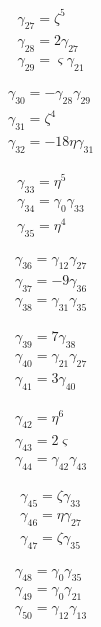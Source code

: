 \[\begin{aligned}\gamma_{27}=\zeta ^{5}\\ \gamma_{28}=2 \gamma_{27}\\ \gamma_{29}=\varsigma  \gamma_{21}\end{aligned}\]

\[\begin{aligned}\gamma_{30}=- \gamma_{28} \gamma_{29}\\ \gamma_{31}=\zeta ^{4}\\ \gamma_{32}=- 18 \eta  \gamma_{31}\end{aligned}\]

\[\begin{aligned}\gamma_{33}=\eta ^{5}\\ \gamma_{34}=\gamma_{0} \gamma_{33}\\ \gamma_{35}=\eta ^{4}\end{aligned}\]

\[\begin{aligned}\gamma_{36}=\gamma_{12} \gamma_{27}\\ \gamma_{37}=- 9 \gamma_{36}\\ \gamma_{38}=\gamma_{31} \gamma_{35}\end{aligned}\]

\[\begin{aligned}\gamma_{39}=7 \gamma_{38}\\ \gamma_{40}=\gamma_{21} \gamma_{27}\\ \gamma_{41}=3 \gamma_{40}\end{aligned}\]

\[\begin{aligned}\gamma_{42}=\eta ^{6}\\ \gamma_{43}=2 \varsigma \\ \gamma_{44}=\gamma_{42} \gamma_{43}\end{aligned}\]

\[\begin{aligned}\gamma_{45}=\zeta  \gamma_{33}\\ \gamma_{46}=\eta  \gamma_{27}\\ \gamma_{47}=\zeta  \gamma_{35}\end{aligned}\]

\[\begin{aligned}\gamma_{48}=\gamma_{0} \gamma_{35}\\ \gamma_{49}=\gamma_{0} \gamma_{21}\\ \gamma_{50}=\gamma_{12} \gamma_{13}\end{aligned}\]

